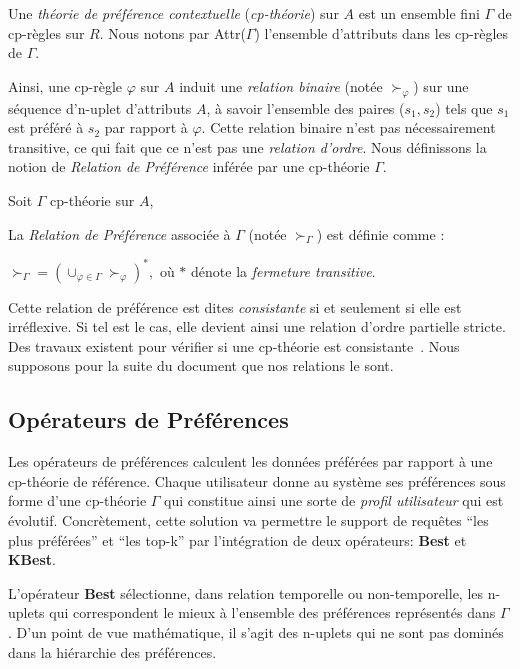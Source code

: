 Une \textit{théorie de préférence contextuelle} (\textit{cp-théorie}) sur $A$ est un ensemble fini $\Gamma$ de cp-règles sur $R$. Nous notons par Attr($\Gamma$) l'ensemble d'attributs dans les cp-règles de $\Gamma$.

Ainsi, une cp-règle $\varphi$ sur $A$ induit une \textit{relation binaire} (notée $\succ_\varphi$) sur une séquence d'n-uplet d'attributs $A$, à savoir l'ensemble des paires ($s_1,s_2$) tels que $s_1$ est préféré à $s_2$ par rapport à $\varphi$. Cette relation binaire n'est pas nécessairement transitive, ce qui fait que ce n'est pas une \textit{relation d'ordre}. Nous définissons la notion de \textit{Relation de Préférence} inférée par une cp-théorie $\Gamma$.

\begin{defi}
Soit $\Gamma$ cp-théorie sur $A$,

La \textit{Relation de Préférence} associée à $\Gamma$ (notée $\succ_\Gamma$) est définie comme :
\begin{center} $\succ_\Gamma = (\cup_{\varphi \in \Gamma} \succ_\varphi)^*,$ o\`u $*$ dénote la \textit{fermeture transitive}.\end{center}
\end{defi}

Cette relation de préférence est dites \textit{consistante} si et seulement si elle est irréflexive. Si tel est le cas, elle devient ainsi une relation d'ordre partielle stricte. Des travaux existent pour vérifier si une cp-théorie est consistante~\cite{Wilson:cpnet}. Nous supposons pour la suite du document que nos relations le sont.

\subsection{Opérateurs de Préférences}
Les opérateurs de préférences calculent les données préférées par rapport à une cp-th\'eorie de référence. Chaque utilisateur donne au système ses préférences sous forme d'une cp-th\'eorie $\Gamma$ qui constitue ainsi une sorte de \textit{profil utilisateur} qui est évolutif. Concrètement, cette solution va permettre le support de requêtes 
\enquote{les plus préférées} et \enquote{les top-k} par l'intégration de deux opérateurs: \textbf{Best} et \textbf{KBest}.

L'opérateur \textbf{Best} sélectionne, dans relation temporelle ou non-temporelle, les n-uplets qui correspondent le mieux à l'ensemble des préférences représentés dans $\Gamma$. D'un point de vue mathématique, il s'agit des n-uplets qui ne sont pas dominés dans la hiérarchie des préférences.

